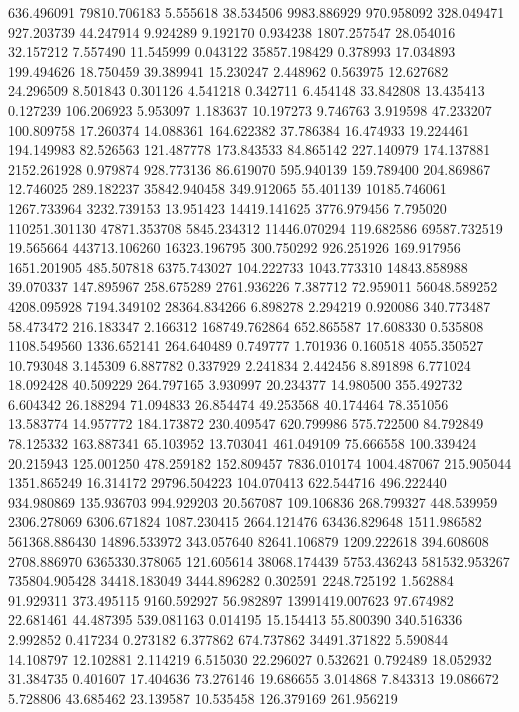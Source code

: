 636.496091
79810.706183
5.555618
38.534506
9983.886929
970.958092
328.049471
927.203739
44.247914
9.924289
9.192170
0.934238
1807.257547
28.054016
32.157212
7.557490
11.545999
0.043122
35857.198429
0.378993
17.034893
199.494626
18.750459
39.389941
15.230247
2.448962
0.563975
12.627682
24.296509
8.501843
0.301126
4.541218
0.342711
6.454148
33.842808
13.435413
0.127239
106.206923
5.953097
1.183637
10.197273
9.746763
3.919598
47.233207
100.809758
17.260374
14.088361
164.622382
37.786384
16.474933
19.224461
194.149983
82.526563
121.487778
173.843533
84.865142
227.140979
174.137881
2152.261928
0.979874
928.773136
86.619070
595.940139
159.789400
204.869867
12.746025
289.182237
35842.940458
349.912065
55.401139
10185.746061
1267.733964
3232.739153
13.951423
14419.141625
3776.979456
7.795020
110251.301130
47871.353708
5845.234312
11446.070294
119.682586
69587.732519
19.565664
443713.106260
16323.196795
300.750292
926.251926
169.917956
1651.201905
485.507818
6375.743027
104.222733
1043.773310
14843.858988
39.070337
147.895967
258.675289
2761.936226
7.387712
72.959011
56048.589252
4208.095928
7194.349102
28364.834266
6.898278
2.294219
0.920086
340.773487
58.473472
216.183347
2.166312
168749.762864
652.865587
17.608330
0.535808
1108.549560
1336.652141
264.640489
0.749777
1.701936
0.160518
4055.350527
10.793048
3.145309
6.887782
0.337929
2.241834
2.442456
8.891898
6.771024
18.092428
40.509229
264.797165
3.930997
20.234377
14.980500
355.492732
6.604342
26.188294
71.094833
26.854474
49.253568
40.174464
78.351056
13.583774
14.957772
184.173872
230.409547
620.799986
575.722500
84.792849
78.125332
163.887341
65.103952
13.703041
461.049109
75.666558
100.339424
20.215943
125.001250
478.259182
152.809457
7836.010174
1004.487067
215.905044
1351.865249
16.314172
29796.504223
104.070413
622.544716
496.222440
934.980869
135.936703
994.929203
20.567087
109.106836
268.799327
448.539959
2306.278069
6306.671824
1087.230415
2664.121476
63436.829648
1511.986582
561368.886430
14896.533972
343.057640
82641.106879
1209.222618
394.608608
2708.886970
6365330.378065
121.605614
38068.174439
5753.436243
581532.953267
735804.905428
34418.183049
3444.896282
0.302591
2248.725192
1.562884
91.929311
373.495115
9160.592927
56.982897
13991419.007623
97.674982
22.681461
44.487395
539.081163
0.014195
15.154413
55.800390
340.516336
2.992852
0.417234
0.273182
6.377862
674.737862
34491.371822
5.590844
14.108797
12.102881
2.114219
6.515030
22.296027
0.532621
0.792489
18.052932
31.384735
0.401607
17.404636
73.276146
19.686655
3.014868
7.843313
19.086672
5.728806
43.685462
23.139587
10.535458
126.379169
261.956219
